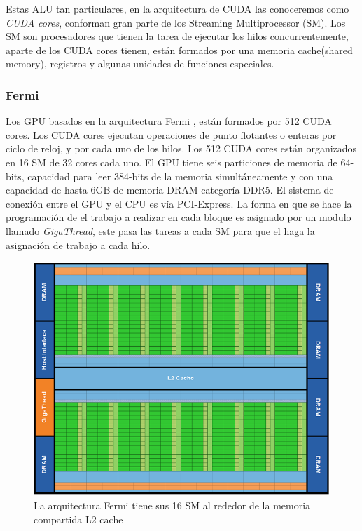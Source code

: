 Estas ALU tan particulares, en la arquitectura de CUDA las conoceremos como \textit{CUDA cores}, conforman gran parte de los Streaming Multiprocessor (SM). Los SM son procesadores que tienen la tarea de ejecutar los hilos concurrentemente, aparte de los CUDA cores tienen, están formados por una memoria cache(shared memory), registros y algunas unidades de funciones especiales.

\subsubsection{Fermi}

Los GPU basados en la arquitectura Fermi \cite{fermi}, están formados por 512 CUDA cores. Los CUDA cores ejecutan operaciones de punto flotantes o enteras por ciclo de reloj, y por cada uno de los hilos. Los 512 CUDA cores están organizados en 16 SM de 32 cores cada uno. El GPU tiene seis particiones de memoria de 64-bits, capacidad para leer 384-bits de la memoria simultáneamente y con una capacidad de hasta 6GB de memoria DRAM categoría DDR5. El sistema de conexión entre el GPU y el CPU es vía PCI-Express. La forma en que se hace la programación de el trabajo a realizar en cada bloque es asignado por un modulo llamado \textit{GigaThread}, este pasa las tareas a cada SM para que el haga la asignación de trabajo a cada hilo. 

\begin{figure}[ph]
			\centering
				\includegraphics[scale=0.7]{img/ArqFermi.png}
			\caption{La arquitectura Fermi tiene sus 16 SM al rededor de la memoria compartida L2 cache \cite{fermi}}
\end{figure}

